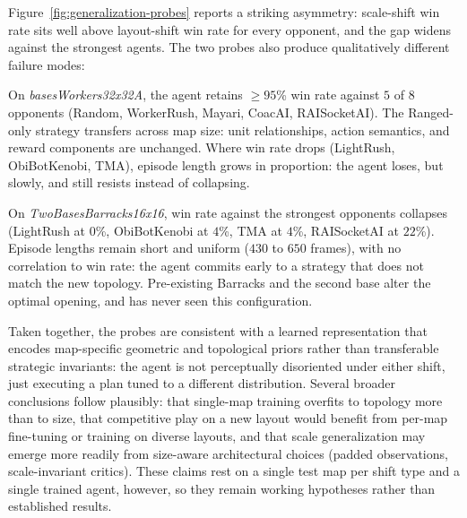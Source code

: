\vspace*{-0.2cm}

Figure~\ref{fig:generalization-probes} reports a striking asymmetry: scale-shift win rate sits well above layout-shift win rate for every opponent, and the gap widens against the strongest agents. The two probes also produce qualitatively different failure modes:

\vspace{0.1cm}

\noindent {} On \emph{basesWorkers32x32A}, the agent retains $\geq 95$\% win rate against $5$ of $8$ opponents (Random, WorkerRush, Mayari, CoacAI, RAISocketAI). The Ranged-only strategy transfers across map size: unit relationships, action semantics, and reward components are unchanged. Where win rate drops (LightRush, ObiBotKenobi, TMA), episode length grows in proportion: the agent loses, but slowly, and still resists instead of collapsing.

\vspace{0.1cm}

\noindent {} On \emph{TwoBasesBarracks16x16}, win rate against the strongest opponents collapses (LightRush at $0$\%, ObiBotKenobi at $4$\%, TMA at $4$\%, RAISocketAI at $22$\%). Episode lengths remain short and uniform ($430$ to $650$ frames), with no correlation to win rate: the agent commits early to a strategy that does not match the new topology. Pre-existing Barracks and the second base alter the optimal opening, and  has never seen this configuration.

\vspace{0.1cm}

Taken together, the probes are consistent with a learned representation that encodes map-specific geometric and topological priors rather than transferable strategic invariants: the agent is not perceptually disoriented under either shift, just executing a plan tuned to a different distribution. Several broader conclusions follow plausibly: that single-map training overfits to topology more than to size, that competitive play on a new layout would benefit from per-map fine-tuning or training on diverse layouts, and that scale generalization may emerge more readily from size-aware architectural choices (padded observations, scale-invariant critics). These claims rest on a single test map per shift type and a single trained agent, however, so they remain working hypotheses rather than established results.


